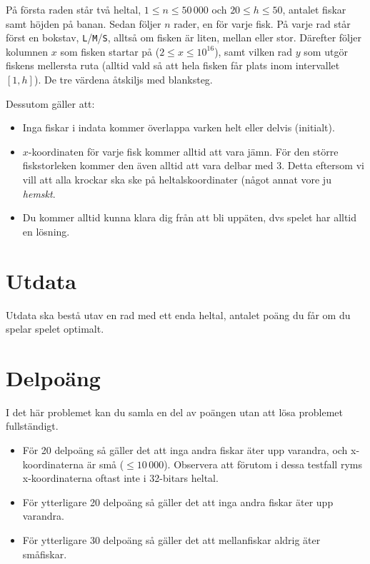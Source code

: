 På första raden står två heltal, $1 \leq n \leq 50\,000$ och $20 \leq
h \leq 50$, antalet fiskar samt höjden på banan. Sedan följer $n$ rader,
en för varje fisk. På varje rad står först en bokstav, \texttt{L}/\texttt{M}/\texttt{S}, alltså om fisken är liten, mellan eller stor. Därefter följer kolumnen $x$ som fisken startar på ($2 \leq x \leq 10^{16}$), samt vilken rad $y$ som utgör fiskens mellersta ruta (alltid vald så att hela fisken får plats inom intervallet $[1, h]$). De tre värdena åtskiljs med blanksteg.

Dessutom gäller att:
\begin{itemize}
  \item
    Inga fiskar i indata kommer överlappa varken helt eller delvis (initialt).
  \item
      $x$-koordinaten för varje fisk kommer alltid att vara jämn. För den större
      fiskstorleken kommer den även alltid att vara delbar med 3. Detta
      eftersom vi vill att alla krockar ska ske på heltalskoordinater (något
      annat vore ju \emph{hemskt}.
  \item
    Du kommer alltid kunna klara dig från att bli uppäten, dvs spelet har
    alltid en lösning.
\end{itemize}

\section*{Utdata}
Utdata ska bestå utav en rad med ett enda heltal, antalet poäng du får om du spelar spelet optimalt.

\section*{Delpoäng}
I det här problemet kan du samla en del av poängen utan att lösa problemet fullständigt.

\begin{itemize}
    \item För 20 delpoäng så gäller det att inga andra fiskar äter upp
          varandra, och x-koordinaterna är små ($\leq 10\,000$). Observera att förutom i dessa testfall ryms x-koordinaterna oftast inte i 32-bitars heltal.
    \item För ytterligare 20 delpoäng så gäller det att inga andra fiskar
          äter upp varandra.
    \item För ytterligare 30 delpoäng så gäller det att mellanfiskar aldrig
          äter småfiskar.
\end{itemize}

